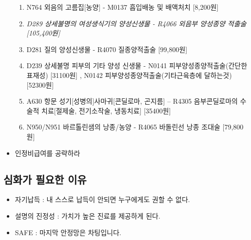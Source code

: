 \begin{itemize}
	\begin{enumerate}\tightlist
	\item N764 외음의 고름집[농양]   - M0137 흡입배농 및 배액처치 [8,200원]
	\item \emph{D289 상세불명의 여성생식기의 양성신생물 - R4066 외음부 양성종양 적출술[105,400원]}
	\item D281 질의 양성신생물 - R4070 질종양적출술 [99,800원]
	\item D239 상세불명 피부의 기타 양성 신생물 -    N0141 피부양성종양적출술(간단한표재성) [31100원] ,   N0142  피부양성종양적출술(기타근육층에 달하는것) [52300원]
	\item A630 항문 성기[성병의]사마귀[콘딜로마, 곤지름] –    R4305 음부콘딜로마의 수술적 치료[절제술, 전기소작술, 냉동치료] 
   [35400원]
	\item N950/N951 바르톨린샘의 낭종/농양 - R4065 바돌린선 낭종 조대술 [79,800원]
	\end{enumerate}
\item 인정비급여를 공략하라	
\end{itemize}

\subsection{심화가 필요한 이유}
\begin{itemize}\tightlist
\item 자기납득 : 내 스스로 납득이 안되면 누구에게도 권할 수 없다.
\item 설명의 진정성 : 가치가 높은 진료를 제공하게 된다.
\item SAFE : 마지막 안정망은 차팅입니다.
\end{itemize}